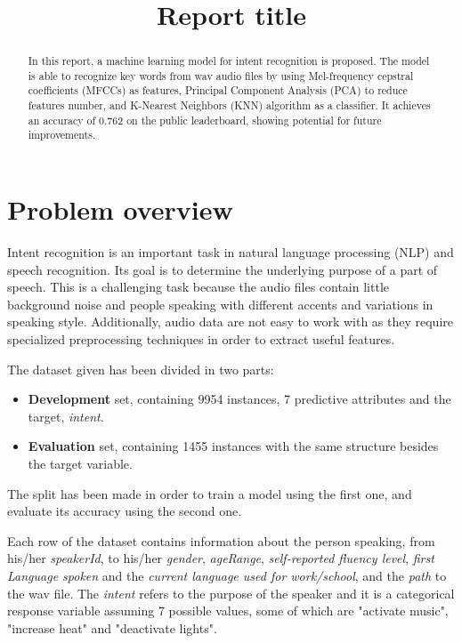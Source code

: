 \documentclass[conference]{IEEEtran}
\begin{document}
\title{Report title}

\author{
}

\maketitle

\begin{abstract}
    In this report, a machine learning model for intent recognition is proposed.
    The model is able to recognize key words from wav audio files by using Mel-frequency cepstral coefficients (MFCCs) as features, Principal Component Analysis (PCA) to reduce features number, and K-Nearest Neighbors (KNN) algorithm as a classifier.
    It achieves an accuracy of 0.762 on the public leaderboard, showing potential for future improvements.
\end{abstract}

\section{Problem overview}
Intent recognition is an important task in natural language processing (NLP) and speech recognition.
Its goal is to determine the underlying purpose of a part of speech.
This is a challenging task because the audio files contain little background noise and people speaking with different accents and variations in speaking style.
Additionally, audio data are not easy to work with as they require specialized preprocessing techniques in order to extract useful features.

The dataset given has been divided in two parts:
\begin{itemize}
    \item \textbf{Development} set, containing 9954 instances, 7 predictive attributes and the target, \textit{intent}.
    \item \textbf{Evaluation} set, containing 1455 instances with the same structure besides the target variable.
\end{itemize}
The split has been made in order to train a model using the first one, and evaluate its accuracy using the second one.

Each row of the dataset contains information about the person speaking, from his/her \textit{speakerId}, to his/her \textit{gender}, \textit{ageRange}, \textit{self-reported fluency level}, \textit{first Language spoken} and the \textit{current language used for work/school}, and the \textit{path} to the wav file.
The \textit{intent} refers to the purpose of the speaker and it is a categorical response variable assuming 7 possible values, some of which are "activate music", "increase heat" and "deactivate lights".
\end{document}
